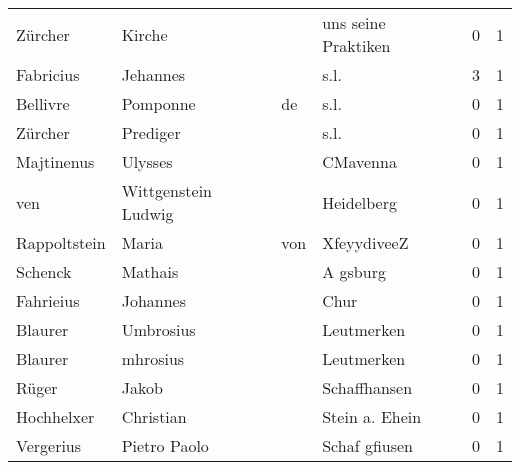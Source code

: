 \documentclass[10pt,a4paper,landscape]{article}
\begin{document}
\begin{longtable}{llllrr}
                  Zürcher &                             Kirche &             &                         uns seine Praktiken &          0 &         1 \\
                Fabricius &                           Jehannes &             &                                        s.l. &          3 &         1 \\
                 Bellivre &                           Pomponne &          de &                                        s.l. &          0 &         1 \\
                  Zürcher &                           Prediger &             &                                        s.l. &          0 &         1 \\
               Majtinenus &                            Ulysses &             &                                    CMavenna &          0 &         1 \\
                      ven &                Wittgenstein Ludwig &             &                                  Heidelberg &          0 &         1 \\
             Rappoltstein &                              Maria &         von &                                 XfeyydiveeZ &          0 &         1 \\
                  Schenck &                            Mathais &             &                                    A gsburg &          0 &         1 \\
                Fahrieius &                           Johannes &             &                                        Chur &          0 &         1 \\
                  Blaurer &                          Umbrosius &             &                                  Leutmerken &          0 &         1 \\
                  Blaurer &                           mhrosius &             &                                  Leutmerken &          0 &         1 \\
                    Rüger &                              Jakob &             &                                Schaffhansen &          0 &         1 \\
               Hochhelxer &                          Christian &             &                              Stein a. Ehein &          0 &         1 \\
                Vergerius &                       Pietro Paolo &             &                               Schaf gfiusen &          0 &         1 \\

\end{longtable}
\end{document}
